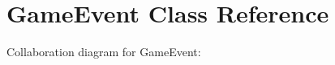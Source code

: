 \hypertarget{class_game_event}{}\section{Game\+Event Class Reference}
\label{class_game_event}


Collaboration diagram for Game\+Event\+:
